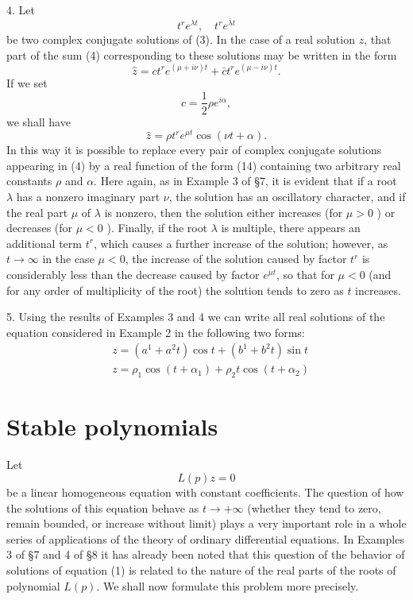 \documentclass[10pt,a5paper]{book}
\theoremstyle{plain}
\theoremstyle{definition}
\theoremstyle{remark}
\begin{document}
4. Let
\[
t^{r} e^{\lambda t}, \quad t^{r} e^{\bar{\lambda} t}
\]
be two complex conjugate solutions of (3). In the case of a real solution $z$, that part of the sum (4) corresponding to these solutions may be written in the form
\[
\hat{z}=c t^{r} e^{(\mu+i \nu) t}+\bar{c} t^{r} e^{(\mu-i \nu) t} .
\]
If we set
\[
c=\frac{1}{2} \rho e^{i \alpha},
\]
we shall have
\begin{equation*}
\hat{z}=\rho t^{r} e^{\mu t} \cos (\nu t+\alpha) . \tag{14}
\end{equation*}
In this way it is possible to replace every pair of complex conjugate solutions appearing in (4) by a real function of the form (14) containing two arbitrary real constants $\rho$ and $\alpha$. Here again, as in Example 3 of §7, it is evident that if a root $\lambda$ has a nonzero imaginary part $\nu$, the solution has an oscillatory character, and if the real part $\mu$ of $\lambda$ is nonzero, then the solution either increases (for $\mu>0$ ) or decreases (for $\mu<0$ ). Finally, if the root $\lambda$ is multiple, there appears an additional term $t^{r}$, which causes a further increase of the solution; however, as $t \rightarrow \infty$ in the case $\mu<0$, the increase of the solution caused by factor $t^{r}$ is considerably less than the decrease caused by factor $e^{\mu t}$, so that for $\mu<0$ (and for any order of multiplicity of the root) the solution tends to zero as $t$ increases.

5. Using the results of Examples 3 and 4 we can write all real solutions of the equation considered in Example 2 in the following two forms:
\[
\begin{aligned}
& z=\left(a^{1}+a^{2} t\right) \cos t+\left(b^{1}+b^{2} t\right) \sin t \\
& z=\rho_{1} \cos \left(t+\alpha_{1}\right)+\rho_{2} t \cos \left(t+\alpha_{2}\right)
\end{aligned}
\]

\section{Stable polynomials}
Let
\begin{equation*}
L(p) z=0 \tag{1}
\end{equation*}
be a linear homogeneous equation with constant coefficients. The question of how the solutions of this equation behave as $t \rightarrow+\infty$ (whether they tend to zero, remain bounded, or increase without limit) plays a very important role in a whole series of applications of the theory of ordinary differential equations. In Examples 3 of §7 and 4 of §8 it has already been noted that this question of the behavior of solutions of equation (1) is related to the nature of the real parts of the roots of polynomial $L(p)$. We shall now formulate this problem more precisely.
\end{document}
